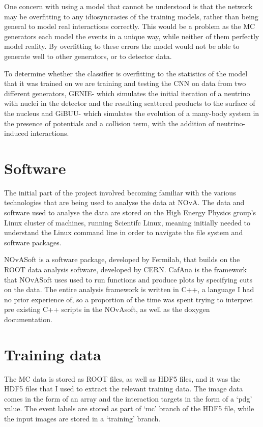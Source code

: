 \documentclass[11pt]{article}
\begin{document}
One concern with using a model that cannot be understood is that the network may be overfitting to any idiosyncrasies of the training models, rather than being general to model real interactions correctly. This would be a problem as the MC generators each model the events in a unique way, while neither of them perfectly model reality. By overfitting to these errors the model would not be able to generate well to other generators, or to detector data. 

To determine whether the classifier is overfitting to the statistics of the model that it was trained on we are training and testing the CNN on data from two different generators, GENIE- which simulates the initial iteration of a neutrino with nuclei in the detector and the resulting scattered products to the surface of the nucleus and GiBUU- which simulates the evolution of a many-body system in the presence of potentials and a collision term, with the addition of neutrino-induced interactions. 



\section*{Software}

The initial part of the project involved becoming familiar with the various technologies that are being used  to analyse the data at NOvA. The data and software used to analyse the data are stored on the High Energy Physics group’s Linux cluster of machines, running Scientifc Linux, meaning initially needed to understand the Linux command line in order to navigate the file system and software packages. 

NOvASoft is a software package, developed by Fermilab, that builds on the ROOT data analysis software, developed by CERN. CafAna is the framework that NOvASoft uses used to run functions and produce plots by specifying cuts on the data. The entire analysis framework is written in C++, a language I had no prior experience of, so a proportion of the time was spent trying to interpret pre existing C++ scripts in the NOvAsoft, as well as the doxygen documentation. 


\section*{Training data}

The MC data is stored as ROOT files, as well as HDF5 files, and it was the HDF5 files that I used to extract the relevant training data. The image data comes in the form of an array and the interaction targets in the form of a ‘pdg’ value. The event labels are stored as part of ‘mc’ branch of the HDF5 file, while the input images are stored in a ‘training’ branch. 
\end{document}
